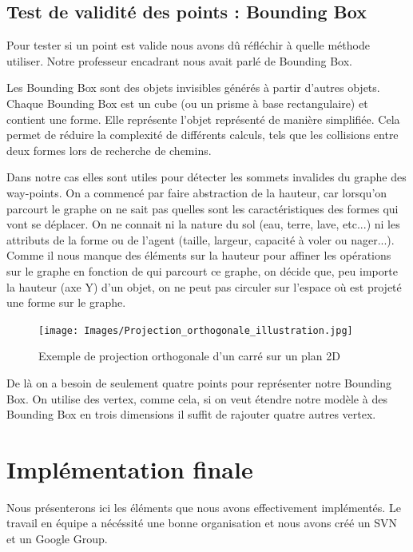 \documentclass[a4paper,12pt]{report}
\begin{document}
\section{Test de validité des points : Bounding Box}

Pour tester si un point est valide nous avons dû réfléchir à quelle méthode utiliser. Notre professeur encadrant nous avait parlé de Bounding Box.

Les Bounding Box sont des objets invisibles générés à partir d'autres objets. Chaque Bounding Box est un cube (ou un prisme à base rectangulaire) et contient une forme. Elle représente l'objet représenté de manière simplifiée. Cela permet de réduire la complexité de différents calculs, tels que les collisions entre deux formes lors de recherche de chemins.

Dans notre cas elles sont utiles pour détecter les sommets invalides du graphe des way-points. On a commencé par faire abstraction de la hauteur, car lorsqu'on parcourt le graphe on ne sait pas quelles sont les caractéristiques des formes qui vont se déplacer. On ne connait ni la nature du sol (eau, terre, lave, etc...) ni les attributs de la forme ou de l'agent (taille, largeur, capacité à voler ou nager...). Comme il nous manque des éléments sur la hauteur pour affiner les opérations sur le graphe en fonction de qui parcourt ce graphe, on décide que, peu importe la hauteur (axe Y) d'un objet, on ne peut pas circuler sur l'espace où est projeté une forme sur le graphe. 

\begin{figure}[h]
\centering
\texttt{[image: Images/Projection\_orthogonale\_illustration.jpg]}
\caption{Exemple de projection orthogonale d'un carré sur un plan 2D}
\label{nbintersect}
\end{figure}
\vspace{0.5cm}


De là on a besoin de seulement quatre points pour représenter notre Bounding Box. On utilise des vertex, comme cela, si on veut étendre notre modèle à des Bounding Box en trois dimensions il suffit de rajouter quatre autres vertex.

\chapter{Implémentation finale}

Nous présenterons ici les éléments que nous avons effectivement implémentés. Le travail en équipe a nécéssité une bonne organisation et nous avons créé un SVN et un Google Group.
\end{document}
